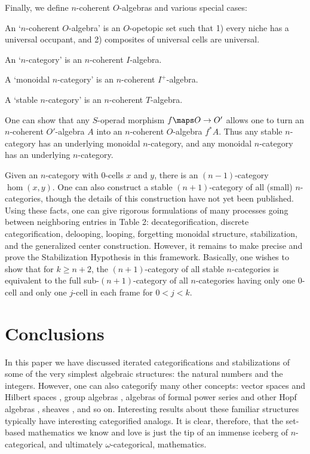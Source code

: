 Finally, we define $n$-coherent $O$-algebras and various special cases:

\begin{defn} \et An `$n$-coherent $O$-algebra' is an $O$-opetopic
set such that 1) every niche has a universal occupant, and 2) composites
of universal cells are universal.  \end{defn}

\begin{defn} \et An `$n$-category' is an $n$-coherent $I$-algebra.
\end{defn}

\begin{defn} \et A `monoidal $n$-category' is an $n$-coherent $I^+$-algebra.
\end{defn}

\begin{defn} \et A `stable $n$-category' is an $n$-coherent $T$-algebra.
\end{defn}

One can show that any $S$-operad morphism $f \maps O \to O'$ allows one
to turn an $n$-coherent $O'$-algebra $A$ into an $n$-coherent
$O$-algebra $f^\ast A$.  Thus any stable $n$-category has an underlying
monoidal $n$-category, and any monoidal $n$-category has an underlying
$n$-category.  

Given an $n$-category with 0-cells $x$ and $y$, there is
an $(n-1)$-category $\hom(x,y)$.  One can also 
construct a stable $(n+1)$-category of all (small) $n$-categories,
though the details of this construction have not yet been published.
Using these facts, one can give rigorous formulations of many 
processes going between neighboring entries in Table 2:
decategorification, discrete categorification, delooping, looping,
forgetting monoidal structure, stabilization, and the generalized center
construction.  However, it remains to make precise and prove the
Stabilization Hypothesis in this framework.  Basically, one wishes to
show that for $k \ge n+2$, the $(n+1)$-category of all stable
$n$-categories is equivalent to the full sub-$(n+1)$-category of all
$n$-categories having only one 0-cell and only one $j$-cell in each
frame for $0 < j < k$.  

\section{Conclusions} \label{conclusions}

In this paper we have discussed iterated categorifications and
stabilizations of some of the very simplest algebraic structures: the
natural numbers and the integers.  However, one can also categorify many
other concepts: vector spaces \cite{KV} and Hilbert spaces \cite{B},
group algebras \cite{CY}, algebras of formal power series
\cite{BD2,Joyal} and other Hopf algebras \cite{CF,CY2}, sheaves
\cite{Breen,Brylinski}, and so on.  Interesting results about these
familiar structures typically have interesting categorified analogs.  It
is clear, therefore, that the set-based mathematics we know and love is
just the tip of an immense iceberg of $n$-categorical, and ultimately
$\omega$-categorical, mathematics.

